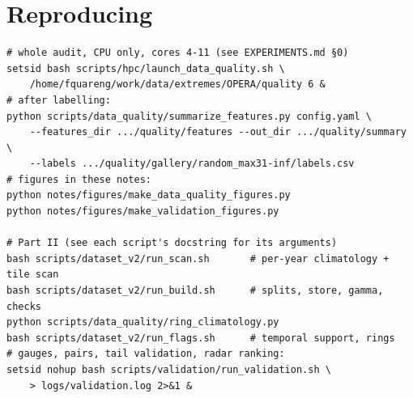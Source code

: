 \documentclass[11pt,a4paper]{article}
\theoremstyle{definition}
\theoremstyle{remark}
\newcommand{\1}{\mathbf{1}}
\begin{document}
\section*{Reproducing}
\begin{verbatim}
# whole audit, CPU only, cores 4-11 (see EXPERIMENTS.md §0)
setsid bash scripts/hpc/launch_data_quality.sh \
    /home/fquareng/work/data/extremes/OPERA/quality 6 &
# after labelling:
python scripts/data_quality/summarize_features.py config.yaml \
    --features_dir .../quality/features --out_dir .../quality/summary \
    --labels .../quality/gallery/random_max31-inf/labels.csv
# figures in these notes:
python notes/figures/make_data_quality_figures.py
python notes/figures/make_validation_figures.py

# Part II (see each script's docstring for its arguments)
bash scripts/dataset_v2/run_scan.sh       # per-year climatology + tile scan
bash scripts/dataset_v2/run_build.sh      # splits, store, gamma, checks
python scripts/data_quality/ring_climatology.py
bash scripts/dataset_v2/run_flags.sh      # temporal support, rings
# gauges, pairs, tail validation, radar ranking:
setsid nohup bash scripts/validation/run_validation.sh \
    > logs/validation.log 2>&1 &
\end{verbatim}
\end{document}
